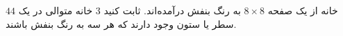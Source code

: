 \p
$44$
خانه از یک صفحه 
$8\times8$
 به رنگ بنفش درآمده‌اند. ثابت کنید 
$3$
 خانه متوالی در یک سطر یا ستون وجود دارند که هر سه به رنگ بنفش باشند.